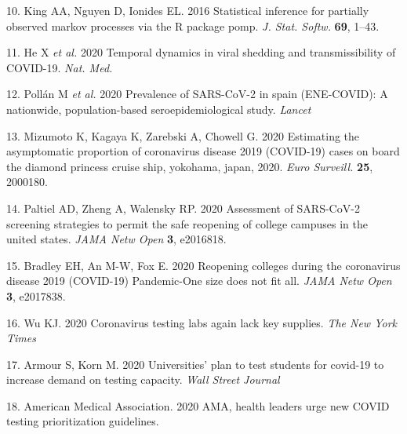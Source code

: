 \documentclass[
]{article}
\newenvironment{cslreferences}%
  {}%
  {\par}
\begin{document}
\begin{cslreferences}
\leavevmode\hypertarget{ref-King2016-ra}{}%
10. King AA, Nguyen D, Ionides EL. 2016 Statistical inference for
partially observed markov processes via the R package pomp. \emph{J.
Stat. Softw.} \textbf{69}, 1--43.

\leavevmode\hypertarget{ref-He2020-pq}{}%
11. He X \emph{et al.} 2020 Temporal dynamics in viral shedding and
transmissibility of COVID-19. \emph{Nat. Med.}

\leavevmode\hypertarget{ref-Pollan2020-xb}{}%
12. Pollán M \emph{et al.} 2020 Prevalence of SARS-CoV-2 in spain
(ENE-COVID): A nationwide, population-based seroepidemiological study.
\emph{Lancet}

\leavevmode\hypertarget{ref-Mizumoto2020-qc}{}%
13. Mizumoto K, Kagaya K, Zarebski A, Chowell G. 2020 Estimating the
asymptomatic proportion of coronavirus disease 2019 (COVID-19) cases on
board the diamond princess cruise ship, yokohama, japan, 2020.
\emph{Euro Surveill.} \textbf{25}, 2000180.

\leavevmode\hypertarget{ref-Paltiel2020-yp}{}%
14. Paltiel AD, Zheng A, Walensky RP. 2020 Assessment of SARS-CoV-2
screening strategies to permit the safe reopening of college campuses in
the united states. \emph{JAMA Netw Open} \textbf{3}, e2016818.

\leavevmode\hypertarget{ref-Bradley2020-ig}{}%
15. Bradley EH, An M-W, Fox E. 2020 Reopening colleges during the
coronavirus disease 2019 (COVID-19) Pandemic-One size does not fit all.
\emph{JAMA Netw Open} \textbf{3}, e2017838.

\leavevmode\hypertarget{ref-Wu2020-bc}{}%
16. Wu KJ. 2020 Coronavirus testing labs again lack key supplies.
\emph{The New York Times}

\leavevmode\hypertarget{ref-Armour2020-pr}{}%
17. Armour S, Korn M. 2020 Universities' plan to test students for
covid-19 to increase demand on testing capacity. \emph{Wall Street
Journal}

\leavevmode\hypertarget{ref-American_Medical_Association2020-mi}{}%
18. American Medical Association. 2020 AMA, health leaders urge new
COVID testing prioritization guidelines.
\end{cslreferences}
\end{document}
